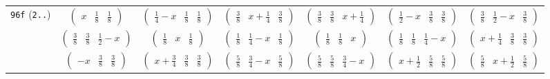 \documentclass[fleqn,9pt,landscape]{jsarticle}
\begin{document}
\begin{center}
\begin{longtable}{ccccccc}
{\tt 96f} ({\tt 2..}) & $ \begin{pmatrix} x & \frac{1}{8} & \frac{1}{8} \end{pmatrix} $ & $ \begin{pmatrix} \frac{1}{4} - x & \frac{1}{8} & \frac{1}{8} \end{pmatrix} $ & $ \begin{pmatrix} \frac{3}{8} & x + \frac{1}{4} & \frac{3}{8} \end{pmatrix} $ & $ \begin{pmatrix} \frac{3}{8} & \frac{3}{8} & x + \frac{1}{4} \end{pmatrix} $ & $ \begin{pmatrix} \frac{1}{2} - x & \frac{3}{8} & \frac{3}{8} \end{pmatrix} $ & $ \begin{pmatrix} \frac{3}{8} & \frac{1}{2} - x & \frac{3}{8} \end{pmatrix} $ \\
& $ \begin{pmatrix} \frac{3}{8} & \frac{3}{8} & \frac{1}{2} - x \end{pmatrix} $ & $ \begin{pmatrix} \frac{1}{8} & x & \frac{1}{8} \end{pmatrix} $ & $ \begin{pmatrix} \frac{1}{8} & \frac{1}{4} - x & \frac{1}{8} \end{pmatrix} $ & $ \begin{pmatrix} \frac{1}{8} & \frac{1}{8} & x \end{pmatrix} $ & $ \begin{pmatrix} \frac{1}{8} & \frac{1}{8} & \frac{1}{4} - x \end{pmatrix} $ & $ \begin{pmatrix} x + \frac{1}{4} & \frac{3}{8} & \frac{3}{8} \end{pmatrix} $ \\
& $ \begin{pmatrix} - x & \frac{3}{8} & \frac{3}{8} \end{pmatrix} $ & $ \begin{pmatrix} x + \frac{3}{4} & \frac{3}{8} & \frac{3}{8} \end{pmatrix} $ & $ \begin{pmatrix} \frac{5}{8} & \frac{3}{4} - x & \frac{5}{8} \end{pmatrix} $ & $ \begin{pmatrix} \frac{5}{8} & \frac{5}{8} & \frac{3}{4} - x \end{pmatrix} $ & $ \begin{pmatrix} x + \frac{1}{2} & \frac{5}{8} & \frac{5}{8} \end{pmatrix} $ & $ \begin{pmatrix} \frac{5}{8} & x + \frac{1}{2} & \frac{5}{8} \end{pmatrix} $ \\

\end{longtable}
\end{center}
\end{document}
